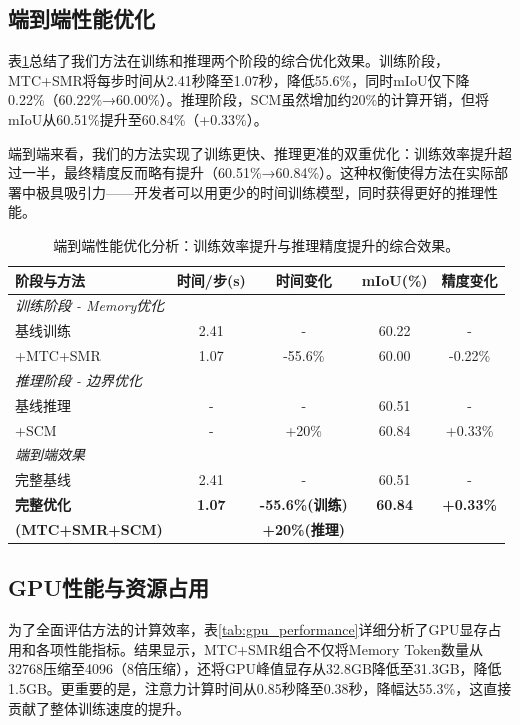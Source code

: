 \subsection{端到端性能优化}

表\ref{tab:end_to_end}总结了我们方法在训练和推理两个阶段的综合优化效果。训练阶段，MTC+SMR将每步时间从2.41秒降至1.07秒，降低55.6\%，同时mIoU仅下降0.22\%（60.22\%→60.00\%）。推理阶段，SCM虽然增加约20\%的计算开销，但将mIoU从60.51\%提升至60.84\%（+0.33\%）。

端到端来看，我们的方法实现了训练更快、推理更准的双重优化：训练效率提升超过一半，最终精度反而略有提升（60.51\%→60.84\%）。这种权衡使得方法在实际部署中极具吸引力——开发者可以用更少的时间训练模型，同时获得更好的推理性能。

\begin{table}[t]
\centering
\caption{端到端性能优化分析：训练效率提升与推理精度提升的综合效果。}
\label{tab:end_to_end}
\small
\begin{tabular}{lcccc}
\toprule
\textbf{阶段与方法} & \textbf{时间/步(s)} & \textbf{时间变化} & \textbf{mIoU(\%)} & \textbf{精度变化} \\
\midrule
\multicolumn{5}{l}{\textit{训练阶段 - Memory优化}} \\
\quad 基线训练 & 2.41 & - & 60.22 & - \\
\quad +MTC+SMR & 1.07 & -55.6\% & 60.00 & -0.22\% \\
\midrule
\multicolumn{5}{l}{\textit{推理阶段 - 边界优化}} \\
\quad 基线推理 & - & - & 60.51 & - \\
\quad +SCM & - & +20\% & 60.84 & +0.33\% \\
\midrule
\multicolumn{5}{l}{\textit{端到端效果}} \\
\quad 完整基线 & 2.41 & - & 60.51 & - \\
\quad \textbf{完整优化} & \textbf{1.07} & \textbf{-55.6\%(训练)} & \textbf{60.84} & \textbf{+0.33\%} \\
\quad \textbf{(MTC+SMR+SCM)} & & \textbf{+20\%(推理)} & & \\
\bottomrule
\end{tabular}
\end{table}

\subsection{GPU性能与资源占用}

为了全面评估方法的计算效率，表\ref{tab:gpu_performance}详细分析了GPU显存占用和各项性能指标。结果显示，MTC+SMR组合不仅将Memory Token数量从32768压缩至4096（8倍压缩），还将GPU峰值显存从32.8GB降低至31.3GB，降低1.5GB。更重要的是，注意力计算时间从0.85秒降至0.38秒，降幅达55.3\%，这直接贡献了整体训练速度的提升。

